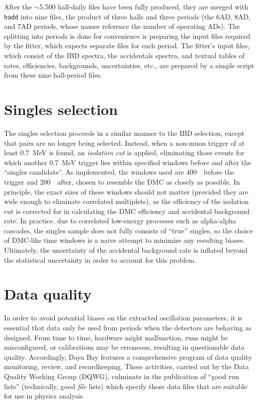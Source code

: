 \documentclass[../thesis.tex]{subfiles}
\begin{document}
After the $\sim$5,500 hall-daily files have been fully produced, they are merged
with \texttt{hadd} into nine files, the product of three halls and three periods
(the 6AD, 8AD, and 7AD periods, whose names reference the number of operating
ADs). The splitting into periods is done for convenience is preparing the input
files required by the fitter, which expects separate files for each period. The
fitter's input files, which consist of the IBD spectra, the accidentals spectra,
and textual tables of rates, efficiencies, backgrounds, uncertainties, etc., are
prepared by a simple script from these nine hall-period files.

\section{Singles selection}
\label{sec:selSingles}

The singles selection proceeds in a similar manner to the IBD selection, except
that pairs are no longer being selected. Instead, when a non-muon trigger of at
least 0.7~MeV is found, an \emph{isolation cut} is applied, eliminating those
events for which another 0.7~MeV trigger lies within specified windows before
and after the ``singles candidate''. As implemented, the windows used are
400~\us\ before the trigger and 200~\us\ after, chosen to resemble the DMC as
closely as possible. In principle, the exact sizes of these windows should not
matter (provided they are wide enough to eliminate correlated multiplets), as
the efficiency of the isolation cut is corrected for in calculating the DMC
efficiency and accidental background rate. In practice, due to correlated
low-energy processes such as alpha-alpha cascades, the singles sample does not
fully consists of ``true'' singles, so the choice of DMC-like time windows is a
naive attempt to minimize any resulting biases. Ultimately, the uncertainty of
the accidental background rate is inflated beyond the statistical uncertainty in
order to account for this problem.

\section{Data quality}
\label{sec:selDataQuality}

In order to avoid potential biases on the extracted oscillation parameters, it
is essential that data only be used from periods when the detectors are behaving
as designed. From time to time, hardware might malfunction, runs might be
misconfigured, or calibrations may be erroneous, resulting in questionable data
quality. Accordingly, Daya Bay features a comprehensive program of data quality
monitoring, review, and recordkeeping. These activities, carried out by the Data
Quality Working Group (DQWG), culminate in the publication of ``good run lists''
(technically, good \emph{file} lists) which specify those data files that are
suitable for use in physics analysis.
\end{document}
